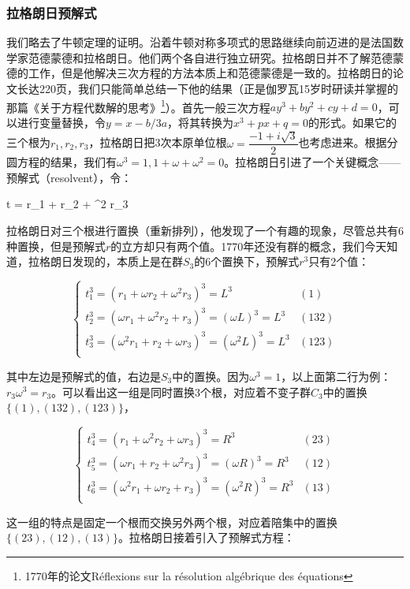 \documentclass[b5paper]{ctexart}
\begin{document}
\subsubsection{拉格朗日预解式}
我们略去了牛顿定理的证明。沿着牛顿对称多项式的思路继续向前迈进的是法国数学家范德蒙德和拉格朗日。他们两个各自进行独立研究。拉格朗日并不了解范德蒙德的工作，但是他解决三次方程的方法本质上和范德蒙德是一致的。拉格朗日的论文长达220页，我们只能简单总结一下他的结果（正是伽罗瓦15岁时研读并掌握的那篇《关于方程代数解的思考》\footnote{1770年的论文Réflexions sur la résolution algébrique des équations}）。首先一般三次方程$ay^3 + by^2 + cy + d = 0$，可以进行变量替换，令$y = x - b / 3a$，将其转换为$x^3 + px + q = 0$的形式。如果它的三个根为$r_1, r_2, r_3$，拉格朗日把3次本原单位根$\omega = \dfrac{-1 + i \sqrt{3}}{2}$也考虑进来。根据分圆方程的结果，我们有$\omega^3 = 1, 1 + \omega + \omega^2 = 0$。拉格朗日引进了一个关键概念——预解式（resolvent），令：

\be
t = r_1 + \omega r_2 + \omega^2 r_3
\ee

拉格朗日对三个根进行置换（重新排列），他发现了一个有趣的现象，尽管总共有6种置换，但是预解式$r$的立方却只有两个值。1770年还没有群的概念，我们今天知道，拉格朗日发现的，本质上是在群$S_3$的6个置换下，预解式$r^3$只有2个值：

\[
\begin{cases}
t_1^3 = (r_1 + \omega r_2 + \omega^2 r_3)^3 = L^3 & (1) \\
t_2^3 = (\omega r_1 + \omega^2 r_2 + r_3)^3 = (\omega L)^3 = L^3 & (132) \\
t_3^3 = (\omega^2 r_1 + r_2 + \omega r_3)^3 = (\omega^2 L)^3 = L^3 & (123) \\
\end{cases}
\]

其中左边是预解式的值，右边是$S_3$中的置换。因为$\omega^3 = 1$，以上面第二行为例：$r_3 \omega^3 = r_3$。可以看出这一组是同时置换3个根，对应着不变子群$C_3$中的置换$\{(1), (132), (123)\}$，

\[
\begin{cases}
t_4^3 = (r_1 + \omega^2 r_2 + \omega r_3)^3 = R^3 & (23) \\
t_5^3 = (\omega r_1 + r_2 + \omega^2 r_3)^3 = (\omega R)^3 = R^3 & (12) \\
t_6^3 = (\omega^2 r_1 + \omega r_2 + r_3)^3 = (\omega^2 R)^3 = R^3 & (13) \\
\end{cases}
\]

这一组的特点是固定一个根而交换另外两个根，对应着陪集中的置换$\{(23), (12), (13)\}$。拉格朗日接着引入了预解式方程：
\end{document}
